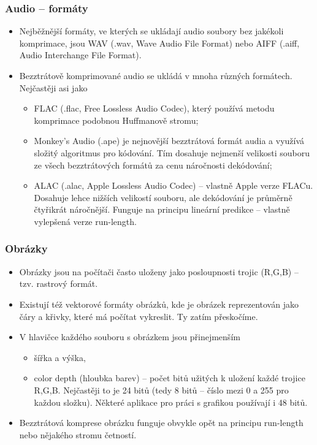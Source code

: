 \documentclass[aspectratio=169,11pt,svgnames]{beamer}
\begin{document}
\begin{frame}
 \frametitle{Audio -- formáty}
 \vspace*{-1em}
 \begin{itemize}[label=\textbullet]
  \item Nejběžnější formáty, ve kterých se ukládají audio soubory \alert{bez
   jakékoli komprimace}, jsou \alert{WAV} (.wav, Wave Audio File Format) nebo
   \alert{AIFF} (.aiff, Audio Interchange File Format).
  \item Bezztrátově komprimované audio se ukládá v mnoha různých formátech.
   Nejčastěji asi jako
   \begin{itemize}[label=\textemdash]
    \item \alert{FLAC} (.flac, Free Lossless Audio Codec), který používá metodu
     komprimace podobnou Huffmanově stromu;
    \pause
    \item \alert{Monkey's Audio} (.ape) je nejnovější bezztrátová formát audia a
     využívá složitý algoritmus pro kódování. Tím dosahuje nejmenší velikosti
     souboru ze všech bezztrátových formátů za cenu náročnosti dekódování;
    \pause
    \item \alert{ALAC} (.alac, Apple Lossless Audio Codec) -- vlastně Apple
     verze FLACu. Dosahuje lehce nižších velikostí souboru, ale dekódování je
     průměrně čtyřikrát náročnější. Funguje na principu lineární predikce --
     vlastně vylepšená verze run-length.
   \end{itemize}
 \end{itemize}
\end{frame}

\begin{frame}
 \frametitle{Obrázky}
 \begin{itemize}[label=\textbullet]
  \item Obrázky jsou na počítači často uloženy jako posloupnosti trojic
   (R,G,B) -- tzv. \alert{rastrový formát}.\pause
  \item Existují též \alert{vektorové formáty} obrázků, kde je obrázek
   reprezentován jako čáry a křivky, které má počítat vykreslit. Ty zatím
   přeskočíme.
  \pause
  \item V hlavičce každého souboru s obrázkem jsou přinejmenším
  \begin{itemize}[label=\textemdash]
   \item šířka a výška,
   \pause
   \item \alert{color depth} (hloubka barev) -- počet bitů užitých k uložení
    každé trojice R,G,B. Nejčastěji to je 24 bitů (tedy 8 bitů -- číslo mezi 0 a
    255 pro každou složku). Některé aplikace pro práci s grafikou používají i 48
    bitů.
  \end{itemize}
  \pause
  \item Bezztrátová komprese obrázku funguje obvykle opět na principu run-length
   nebo nějakého stromu četností.
 \end{itemize}
\end{frame}
\end{document}
